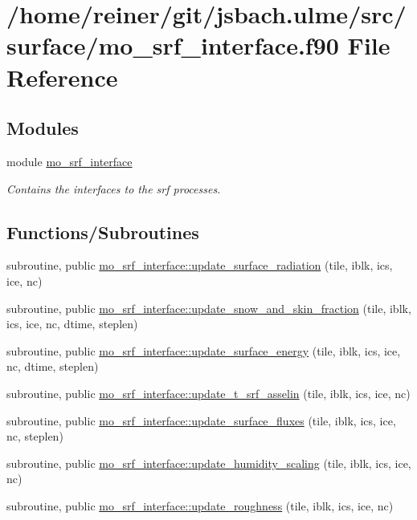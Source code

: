\hypertarget{mo__srf__interface_8f90}{}\section{/home/reiner/git/jsbach.ulme/src/surface/mo\+\_\+srf\+\_\+interface.f90 File Reference}
\label{mo__srf__interface_8f90}
\subsection*{Modules}
\begin{DoxyCompactItemize}
\item 
module \hyperlink{namespacemo__srf__interface}{mo\+\_\+srf\+\_\+interface}
\begin{DoxyCompactList}\small\item\em Contains the interfaces to the srf processes. \end{DoxyCompactList}\end{DoxyCompactItemize}
\subsection*{Functions/\+Subroutines}
\begin{DoxyCompactItemize}
\item 
subroutine, public \hyperlink{namespacemo__srf__interface_a137b2fda7589cf50e04e3eaafc16ca43}{mo\+\_\+srf\+\_\+interface\+::update\+\_\+surface\+\_\+radiation} (tile, iblk, ics, ice, nc)
\item 
subroutine, public \hyperlink{namespacemo__srf__interface_ac20b7f42f80cf50fcae6c709a2c70f8f}{mo\+\_\+srf\+\_\+interface\+::update\+\_\+snow\+\_\+and\+\_\+skin\+\_\+fraction} (tile, iblk, ics, ice, nc, dtime, steplen)
\item 
subroutine, public \hyperlink{namespacemo__srf__interface_a35bdafa30fe0752a3903d61fc30173cf}{mo\+\_\+srf\+\_\+interface\+::update\+\_\+surface\+\_\+energy} (tile, iblk, ics, ice, nc, dtime, steplen)
\item 
subroutine, public \hyperlink{namespacemo__srf__interface_a5633e536e2d4fb8351760c1a5c8bf972}{mo\+\_\+srf\+\_\+interface\+::update\+\_\+t\+\_\+srf\+\_\+asselin} (tile, iblk, ics, ice, nc)
\item 
subroutine, public \hyperlink{namespacemo__srf__interface_acdac2acc6bb50d7ecc7dea28ea5b3e87}{mo\+\_\+srf\+\_\+interface\+::update\+\_\+surface\+\_\+fluxes} (tile, iblk, ics, ice, nc, steplen)
\item 
subroutine, public \hyperlink{namespacemo__srf__interface_a5b41ccc70c29c3591021f628805678fa}{mo\+\_\+srf\+\_\+interface\+::update\+\_\+humidity\+\_\+scaling} (tile, iblk, ics, ice, nc)
\item 
subroutine, public \hyperlink{namespacemo__srf__interface_ae587e1259627bd94efdfc4698cebe49a}{mo\+\_\+srf\+\_\+interface\+::update\+\_\+roughness} (tile, iblk, ics, ice, nc)
\end{DoxyCompactItemize}
